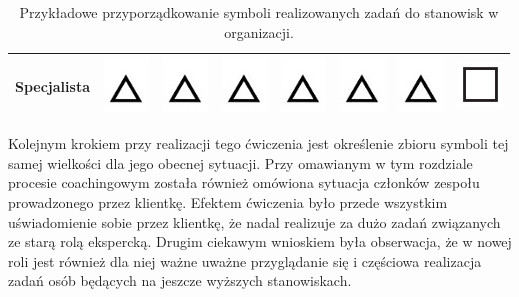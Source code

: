 \begin{table}[!ht]
\begin{tabular}{|l|c|c|c|c|c|c|c|}
  Specjalista & \includegraphics{img/s1} & \includegraphics{img/s1} & \includegraphics{img/s1} & \includegraphics{img/s1} & \includegraphics{img/s1} & \includegraphics{img/s1} & \includegraphics{img/s2}\\ \hline
  \end{tabular}
  \caption{Przykładowe przyporządkowanie symboli realizowanych zadań do stanowisk w organizacji.}
  \label{table:figureitout}
\end{table}

Kolejnym krokiem przy realizacji tego ćwiczenia jest określenie zbioru symboli tej samej wielkości dla jego obecnej sytuacji.
Przy omawianym w tym rozdziale procesie coachingowym została również omówiona sytuacja członków zespołu prowadzonego przez klientkę.
Efektem ćwiczenia było przede wszystkim uświadomienie sobie przez klientkę, że nadal realizuje za dużo zadań związanych ze starą rolą ekspercką.
Drugim ciekawym wnioskiem była obserwacja, że w nowej roli jest również dla niej ważne uważne przyglądanie się i częściowa realizacja zadań
osób będących na jeszcze wyższych stanowiskach. \\

